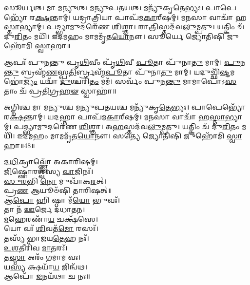 
𑌸𑍂𑌰𑍍𑌯𑌶𑍍𑌚 𑌮𑌾 𑌮𑌨𑍍𑌯𑍁𑌶𑍍𑌚 𑌮𑌨𑍍𑌯𑍁𑌪𑌤𑌯𑌶𑍍𑌚 𑌮𑌨𑍍𑌯𑍁᳴𑌕𑍃\-\ul{𑌤𑍇}\-𑌭𑍍𑌯𑌃। 𑌪𑌾𑌪𑍇𑌭𑍍𑌯𑍋᳴ 𑌰\-\ul{𑌕𑍍𑌷}\-𑌨𑍍𑌤𑌾𑌮𑍍। 𑌯𑌦𑍍𑌰𑌾𑌤𑍍𑌰𑌿𑌯𑌾 𑌪𑌾𑌪᳴𑌮\-\ul{𑌕𑌾}\-𑌰𑍍‌𑌷𑌮𑍍। 𑌮𑌨𑌸𑌾 𑌵𑌾𑌚𑌾᳴ 𑌹\-\ul{𑌸𑍍𑌤𑌾}\-𑌭𑍍𑌯𑌾𑌮𑍍। 𑌪𑌦𑍍𑌭𑍍𑌯𑌾𑌮𑍁𑌦𑌰𑍇᳴𑌣 \ul{𑌶𑌿}\-𑌶𑍍𑌞𑌾। 𑌰𑌾\-\ul{𑌤𑍍𑌰𑌿}\-𑌸𑍍𑌤𑌦᳴𑌵\-\ul{𑌲𑍁}\-𑌮𑍍𑌪𑌤𑍁। 𑌯𑌤𑍍𑌕𑌿𑌂 𑌚᳴ 𑌦𑍁\-\ul{𑌰𑌿}\-𑌤𑌂 𑌮𑌯𑌿᳴। 𑌇𑌦𑌮𑌹𑌂 𑌮𑌾𑌮𑌮𑍃᳴𑌤\-\ul{𑌯𑍋}\-𑌨𑍗। 𑌸𑍂𑌰𑍍𑌯𑍇 𑌜𑍍𑌯𑍋𑌤𑌿𑌷𑌿 𑌜𑍁𑌹𑍋᳴𑌮𑌿 \ul{𑌸𑍍𑌵𑌾}\-𑌹𑌾॥


𑌆𑌪𑌃᳴ 𑌪𑍁𑌨𑌨𑍍𑌤𑍁 𑌪𑍃\-\ul{𑌥𑌿}\-𑌵𑍀𑌂 𑌪𑍃᳴\-\ul{𑌥𑌿}\-𑌵𑍀 \ul{𑌪𑍂}\-𑌤𑌾 𑌪𑍁᳴𑌨𑌾\-\ul{𑌤𑍁} 𑌮𑌾𑌮𑍍। \ul{𑌪𑍁}\-𑌨\-\ul{𑌨𑍍𑌤𑍁} 𑌬𑍍𑌰𑌹𑍍𑌮᳴\-\ul{𑌣}\-𑌸𑍍𑌪\-\ul{𑌤𑌿}\-𑌰𑍍𑌬𑍍𑌰𑌹𑍍𑌮᳴\-\ul{𑌪𑍂}\-𑌤𑌾 𑌪𑍁᳴𑌨𑌾\-\ul{𑌤𑍁} 𑌮𑌾𑌮𑍍। 𑌯𑌦𑍁𑌚𑍍𑌛𑌿᳴\-\ul{𑌷𑍍𑌟}\-𑌮𑌭𑍋॑\-\ul{𑌜𑍍𑌯𑌂} 𑌯𑌦𑍍𑌵𑌾᳴ \ul{𑌦𑍁}\-𑌶𑍍𑌚𑌰𑌿᳴\-\ul{𑌤𑌂} 𑌮𑌮᳴। 𑌸𑌰𑍍𑌵𑌂᳴ 𑌪𑍁𑌨\-\ul{𑌨𑍍𑌤𑍁} 𑌮𑌾𑌮𑌾𑌪𑍋᳴𑌽\-\ul{𑌸}\-𑌤𑌾𑌂 𑌚᳴ 𑌪𑍍𑌰\-\ul{𑌤𑌿}\-𑌗𑍍𑌰\-\ul{𑌹}\-\-\ul{𑍟} 𑌸𑍍𑌵𑌾𑌹𑌾॑॥


𑌅𑌗𑍍𑌨𑌿𑌶𑍍𑌚 𑌮𑌾 𑌮𑌨𑍍𑌯𑍁𑌶𑍍𑌚 𑌮𑌨𑍍𑌯𑍁𑌪𑌤𑌯𑌶𑍍𑌚 𑌮𑌨𑍍𑌯𑍁᳴𑌕𑍃\-\ul{𑌤𑍇}\-𑌭𑍍𑌯𑌃। 𑌪𑌾𑌪𑍇𑌭𑍍𑌯𑍋᳴ 𑌰\-\ul{𑌕𑍍𑌷}\-𑌨𑍍𑌤𑌾𑌮𑍍। 𑌯𑌦𑌹𑍍𑌨𑌾 𑌪𑌾𑌪᳴𑌮\-\ul{𑌕𑌾}\-𑌰𑍍‌𑌷𑌮𑍍। 𑌮𑌨𑌸𑌾 𑌵𑌾𑌚𑌾᳴ 𑌹\-\ul{𑌸𑍍𑌤𑌾}\-𑌭𑍍𑌯𑌾𑌮𑍍। 𑌪𑌦𑍍𑌭𑍍𑌯𑌾𑌮𑍁𑌦𑌰𑍇᳴𑌣 \ul{𑌶𑌿}\-𑌶𑍍𑌞𑌾। 𑌅\-\ul{𑌹}\-𑌸𑍍𑌤𑌦᳴𑌵\-\ul{𑌲𑍁}\-𑌮𑍍𑌪𑌤𑍁। 𑌯𑌤𑍍𑌕𑌿𑌂 𑌚᳴ 𑌦𑍁\-\ul{𑌰𑌿}\-𑌤𑌂 𑌮𑌯𑌿᳴। 𑌇𑌦𑌮𑌹𑌂 𑌮𑌾𑌮𑌮𑍃᳴𑌤\-\ul{𑌯𑍋}\-𑌨𑍗। 𑌸𑌤𑍍𑌯𑍇 𑌜𑍍𑌯𑍋𑌤𑌿𑌷𑌿 𑌜𑍁𑌹𑍋᳴𑌮𑌿 \ul{𑌸𑍍𑌵𑌾}\-𑌹𑌾॥48॥



\-\ul{𑌦}\-\-\ul{𑌧𑌿}\-𑌕𑍍𑌰𑌾𑌵𑍍𑌣𑍍𑌣𑍋᳴ 𑌅𑌕𑌾𑌰𑌿𑌷𑌮𑍍।\\
 \ul{𑌜𑌿}\-𑌷𑍍𑌣𑍋𑌰𑌶𑍍𑌵᳴𑌸𑍍𑌯 \ul{𑌵𑌾}\-𑌜𑌿𑌨𑌃᳴।\\
\-\ul{𑌸𑍁}\-\-\ul{𑌰}\-𑌭𑌿 \ul{𑌨𑍋} 𑌮𑍁𑌖𑌾᳴𑌕\-\ul{𑌰}\-𑌤𑍍।\\
𑌪𑍍𑌰\-\ul{𑌣} 𑌆𑌯𑍂𑍞᳴𑌷𑌿 𑌤𑌾𑌰𑌿𑌷𑌤𑍍॥\\



𑌆\-\ul{𑌪𑍋} 𑌹𑌿 𑌷𑍍𑌠𑌾 𑌮᳴\-\ul{𑌯𑍋} 𑌭𑍁𑌵𑌃᳴।\\
𑌤𑌾 𑌨᳴ \ul{𑌊}\-𑌰𑍍𑌜𑍇 𑌦᳴𑌧𑌾𑌤𑌨।\\
\-\ul{𑌮}\-𑌹𑍇𑌰𑌣𑌾᳴\-\ul{𑌯} 𑌚𑌕𑍍𑌷᳴𑌸𑍇।\\
𑌯𑍋 𑌵𑌃᳴ \ul{𑌶𑌿}\-𑌵𑌤᳴\-\ul{𑌮𑍋} 𑌰𑌸𑌃᳴।\\
𑌤𑌸𑍍𑌯᳴ 𑌭𑌾𑌜𑌯\-\ul{𑌤𑍇}\-𑌹 𑌨𑌃᳴।\\
\-\ul{𑌉}\-\-\ul{𑌶}\-𑌤𑍀𑌰𑌿᳴𑌵 \ul{𑌮𑌾}\-𑌤𑌰𑌃᳴।\\
𑌤\-\ul{𑌸𑍍𑌮𑌾} 𑌅𑌰𑌂᳴ 𑌗𑌮𑌾𑌮 𑌵𑌃।\\
𑌯\-\ul{𑌸𑍍𑌯} 𑌕𑍍𑌷𑌯𑌾᳴\-\ul{𑌯} 𑌜𑌿𑌨𑍍𑌵᳴𑌥।\\
𑌆𑌪𑍋᳴ \ul{𑌜}\-𑌨𑌯᳴𑌥𑌾 𑌚 𑌨𑌃॥\\


